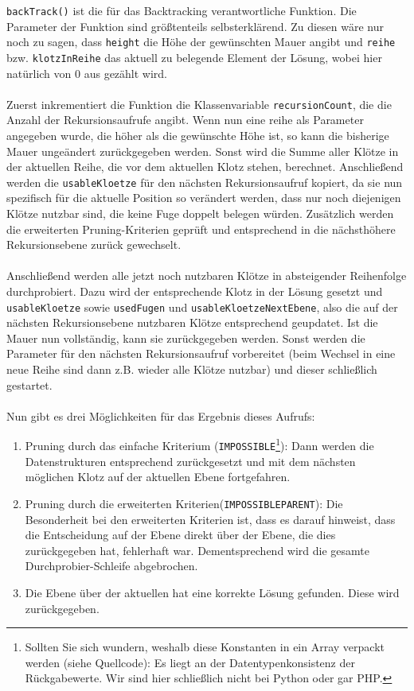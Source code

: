 \documentclass[a4paper, notitlepage, 12pt]{scrartcl}
\begin{document}
\texttt{backTrack()} ist die für das Backtracking verantwortliche Funktion. Die Parameter der Funktion sind größtenteils selbsterklärend. Zu diesen wäre nur noch zu sagen, dass \texttt{height} die Höhe der gewünschten Mauer angibt und \texttt{reihe} bzw. \texttt{klotzInReihe} das aktuell zu belegende Element der Lösung, wobei hier natürlich von 0 aus gezählt wird.
\\ \\
Zuerst inkrementiert die Funktion die Klassenvariable \texttt{recursionCount}, die die Anzahl der Rekursionsaufrufe angibt. Wenn nun eine reihe als Parameter angegeben wurde, die höher als die gewünschte Höhe ist, so kann die bisherige Mauer ungeändert zurückgegeben werden. Sonst wird die Summe aller Klötze in der aktuellen Reihe, die vor dem aktuellen Klotz stehen, berechnet. Anschließend werden die \texttt{usableKloetze} für den nächsten Rekursionsaufruf kopiert, da sie nun spezifisch für die aktuelle Position so verändert werden, dass nur noch diejenigen Klötze nutzbar sind, die keine Fuge doppelt belegen würden. Zusätzlich werden die erweiterten Pruning-Kriterien geprüft und entsprechend in die nächsthöhere Rekursionsebene zurück gewechselt.
\\ \\
Anschließend werden alle jetzt noch nutzbaren Klötze in absteigender Reihenfolge durchprobiert. Dazu wird der entsprechende Klotz in der Lösung gesetzt und \texttt{usableKloetze} sowie \texttt{usedFugen} und \texttt{usableKloetzeNextEbene}, also die auf der nächsten Rekursionsebene nutzbaren Klötze entsprechend geupdatet. Ist die Mauer nun vollständig, kann sie zurückgegeben werden. Sonst werden die Parameter für den nächsten Rekursionsaufruf vorbereitet (beim Wechsel in eine neue Reihe sind dann z.B. wieder alle Klötze nutzbar) und dieser schließlich gestartet.
\\ \\
Nun gibt es drei Möglichkeiten für das Ergebnis dieses Aufrufs:
\begin{enumerate}
\item Pruning durch das einfache Kriterium (\texttt{IMPOSSIBLE}\footnote{Sollten Sie sich wundern, weshalb diese Konstanten in ein Array verpackt werden (siehe Quellcode): Es liegt an der Datentypenkonsistenz der Rückgabewerte. Wir sind hier schließlich nicht bei Python oder gar PHP.}): Dann werden die Datenstrukturen entsprechend zurückgesetzt und mit dem nächsten möglichen Klotz auf der aktuellen Ebene fortgefahren.
\item Pruning durch die erweiterten Kriterien(\texttt{IMPOSSIBLEPARENT}): Die Besonderheit bei den erweiterten Kriterien ist, dass es darauf hinweist, dass die Entscheidung auf der Ebene direkt über der Ebene, die dies zurückgegeben hat, fehlerhaft war. Dementsprechend wird die gesamte Durchprobier-Schleife abgebrochen.
\item Die Ebene über der aktuellen hat eine korrekte Lösung gefunden. Diese wird zurückgegeben.
\end{enumerate}
\end{document}
